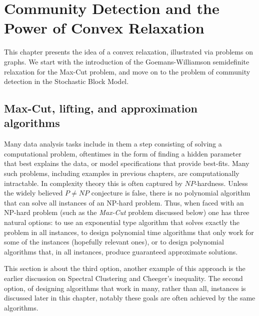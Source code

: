 \chapter{Community \kern-1.2pt Detection and the \kern-1.5pt   Power \kern-1.2pt of Convex \kern-1.2pt Relaxation}
\label{c:community}

This chapter presents the idea of a convex relaxation, illustrated via problems on graphs. We start with the introduction of the Goemans-Williamson semidefinite relaxation for the Max-Cut problem, and move on to the problem of community detection in the Stochastic Block Model.

\section{Max-Cut, lifting, and approximation algorithms}
\label{c:maxcut}\label{maxcutapprox}



Many data analysis tasks include in them a step consisting of solving a computational problem, oftentimes in the form of finding a hidden parameter that best explains the data, or model specifications that provide best-fits. Many such problems, including examples in previous chapters, are computationally intractable. In complexity theory this is often captured by $NP$-hardness. Unless the widely believed $P\neq NP$ conjecture is false, there is no polynomial algorithm that can solve all instances of an NP-hard problem. Thus, when faced with an NP-hard problem (such as the \emph{Max-Cut} problem discussed below) one has three natural options: to use an exponential type algorithm that solves exactly the problem in all instances, to design polynomial time algorithms that only work for some of the instances (hopefully relevant ones), or to design polynomial algorithms that, in all instances, produce guaranteed approximate solutions. 

This section is about the third option, another example of this approach is the earlier discussion on Spectral Clustering and Cheeger's inequality. The second option, of designing algorithms that work in many, rather than all, instances is discussed later in this chapter, notably these goals are often achieved by the same algorithms.




